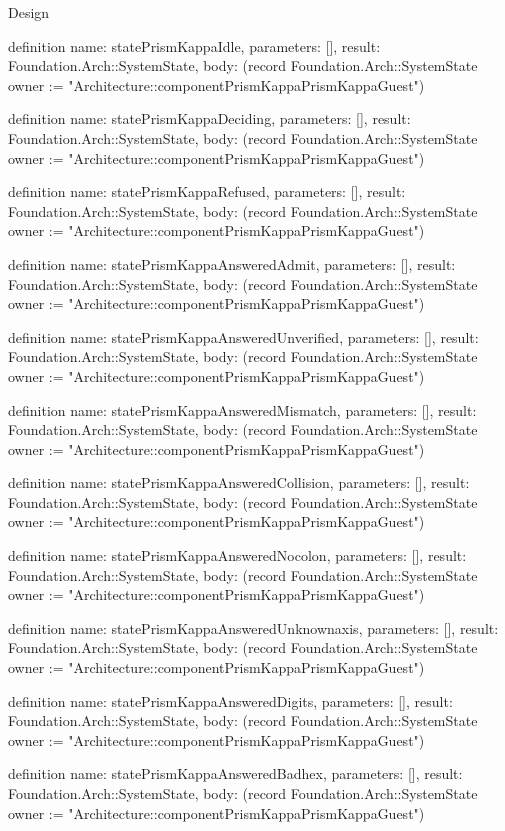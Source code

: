 \begin{lexlean}{Design}
\begin{semanticmodule}
definition{
  name: statePrismKappaIdle,
  parameters: [],
  result: Foundation.Arch::SystemState,
  body: (record Foundation.Arch::SystemState {owner := "Architecture::componentPrismKappaPrismKappaGuest"})
}

definition{
  name: statePrismKappaDeciding,
  parameters: [],
  result: Foundation.Arch::SystemState,
  body: (record Foundation.Arch::SystemState {owner := "Architecture::componentPrismKappaPrismKappaGuest"})
}

definition{
  name: statePrismKappaRefused,
  parameters: [],
  result: Foundation.Arch::SystemState,
  body: (record Foundation.Arch::SystemState {owner := "Architecture::componentPrismKappaPrismKappaGuest"})
}

definition{
  name: statePrismKappaAnsweredAdmit,
  parameters: [],
  result: Foundation.Arch::SystemState,
  body: (record Foundation.Arch::SystemState {owner := "Architecture::componentPrismKappaPrismKappaGuest"})
}

definition{
  name: statePrismKappaAnsweredUnverified,
  parameters: [],
  result: Foundation.Arch::SystemState,
  body: (record Foundation.Arch::SystemState {owner := "Architecture::componentPrismKappaPrismKappaGuest"})
}

definition{
  name: statePrismKappaAnsweredMismatch,
  parameters: [],
  result: Foundation.Arch::SystemState,
  body: (record Foundation.Arch::SystemState {owner := "Architecture::componentPrismKappaPrismKappaGuest"})
}

definition{
  name: statePrismKappaAnsweredCollision,
  parameters: [],
  result: Foundation.Arch::SystemState,
  body: (record Foundation.Arch::SystemState {owner := "Architecture::componentPrismKappaPrismKappaGuest"})
}

definition{
  name: statePrismKappaAnsweredNocolon,
  parameters: [],
  result: Foundation.Arch::SystemState,
  body: (record Foundation.Arch::SystemState {owner := "Architecture::componentPrismKappaPrismKappaGuest"})
}

definition{
  name: statePrismKappaAnsweredUnknownaxis,
  parameters: [],
  result: Foundation.Arch::SystemState,
  body: (record Foundation.Arch::SystemState {owner := "Architecture::componentPrismKappaPrismKappaGuest"})
}

definition{
  name: statePrismKappaAnsweredDigits,
  parameters: [],
  result: Foundation.Arch::SystemState,
  body: (record Foundation.Arch::SystemState {owner := "Architecture::componentPrismKappaPrismKappaGuest"})
}

definition{
  name: statePrismKappaAnsweredBadhex,
  parameters: [],
  result: Foundation.Arch::SystemState,
  body: (record Foundation.Arch::SystemState {owner := "Architecture::componentPrismKappaPrismKappaGuest"})
}


\end{semanticmodule}
\end{lexlean}
